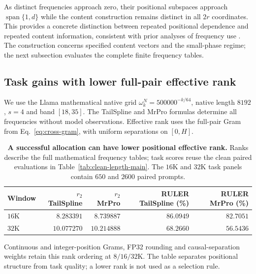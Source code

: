 As distinct frequencies approach zero, their positional subspaces approach
$\operatorname{span}\{1,d\}$ while the content construction remains
distinct in all $2r$ coordinates. This provides a concrete distinction
between repeated positional dependence and repeated content information,
consistent with prior analyses of frequency use \citep{barbero2025round}.
The construction concerns specified content vectors and the small-phase
regime; the next subsection evaluates the complete finite frequency tables.

\subsection{Task gains with lower full-pair effective rank}
\label{sec:allocation-rank-quality}
We use the Llama mathematical native grid
$\omega_k^N=500000^{-k/64}$, native length $8192$, $s=4$ and band $[18,35]$.
The TailSpline and MrPro formulas determine all frequencies without model
observations. Effective rank uses the full-pair Gram from
Eq.~\eqref{eq:cross-gram}, with uniform separations on $[0,H]$.

\begin{table}[ht]
\centering\small
\caption{\textbf{A successful allocation can have lower positional effective rank.}
Ranks describe the full mathematical frequency tables; task scores reuse
the clean paired evaluations in Table~\ref{tab:clean-length-main}.
The $16$K and $32$K task panels contain $650$ and $2600$ paired prompts.}
\label{tab:allocation-rank-quality}
\begin{tabular}{@{}lrrrr@{}}
\toprule
Window & $r_2$ TailSpline & $r_2$ MrPro & RULER TailSpline (\%) & RULER MrPro (\%)\\
\midrule
$16$K & $8.283391$ & $8.739887$ & $86.0949$ & $82.7051$\\
$32$K & $10.077270$ & $10.214888$ & $68.2660$ & $56.5436$\\
\bottomrule
\end{tabular}
\end{table}

Continuous and integer-position Grams, FP32 rounding and causal-separation
weights retain this rank ordering at $8/16/32$K. The table separates positional
structure from task quality; a lower rank is not used as a selection rule.

